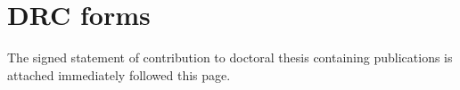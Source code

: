 
\chapter{DRC forms} %

\label{AppendixC} %




The signed statement of contribution to doctoral thesis containing publications is attached immediately followed this page.